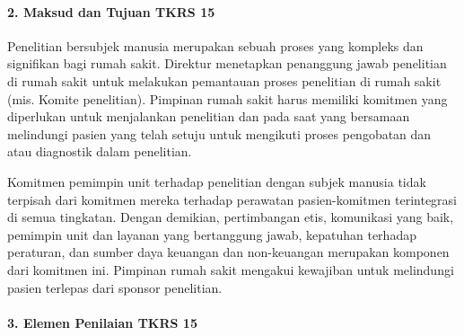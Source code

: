 \documentclass[
]{book}
\begin{document}
\hypertarget{maksud-dan-tujuan-tkrs-15}{%
\paragraph*{2. Maksud dan Tujuan TKRS 15}\label{maksud-dan-tujuan-tkrs-15}}

Penelitian bersubjek manusia merupakan sebuah proses yang kompleks dan signifikan bagi rumah sakit. Direktur menetapkan penanggung jawab penelitian di rumah sakit untuk melakukan pemantauan proses penelitian di rumah sakit (mis. Komite penelitian). Pimpinan rumah sakit harus memiliki komitmen yang diperlukan untuk menjalankan penelitian dan pada saat yang bersamaan melindungi pasien yang telah setuju untuk mengikuti proses pengobatan dan atau diagnostik dalam penelitian.

Komitmen pemimpin unit terhadap penelitian dengan subjek manusia tidak terpisah dari komitmen mereka terhadap perawatan pasien-komitmen terintegrasi di semua tingkatan. Dengan demikian, pertimbangan etis, komunikasi yang baik, pemimpin unit dan layanan yang bertanggung jawab, kepatuhan terhadap peraturan, dan sumber daya keuangan dan non-keuangan merupakan komponen dari komitmen ini. Pimpinan rumah sakit mengakui kewajiban untuk melindungi pasien terlepas dari sponsor penelitian.

\hypertarget{elemen-penilaian-tkrs-15}{%
\paragraph*{3. Elemen Penilaian TKRS 15}\label{elemen-penilaian-tkrs-15}}
\end{document}
